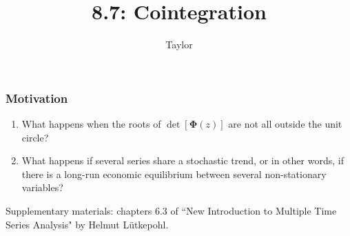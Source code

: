\documentclass{beamer}
\title["8.7"]{8.7: Cointegration}
\author{Taylor}
\institute[UVA] 
{
University of Virginia \\
\medskip
\textit{} 
}
\date{}
\begin{document}

\begin{frame}
\titlepage 
\end{frame}

\begin{frame}
\frametitle{Motivation}

\begin{enumerate}
\item What happens when the roots of $\det[\bm{\Phi}(z)]$ are not all outside the unit circle?
\item What happens if several series share a stochastic trend, or in other words, if there is a long-run economic equilibrium between several non-stationary variables?
\end{enumerate}

Supplementary materials: chapters 6.3 of ``New Introduction to Multiple Time Series Analysis" by Helmut L\"{u}tkepohl.

\end{frame}

\end{document}
